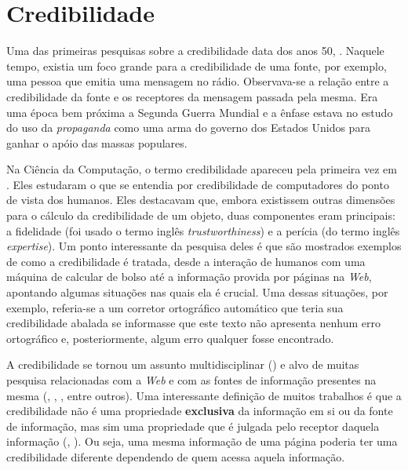 \section{Credibilidade}
\label{sec::credibilidade}

Uma das primeiras pesquisas sobre a credibilidade data dos anos 50, \cite{Hovland51}. Naquele tempo, existia um foco grande para a credibilidade de uma fonte, por exemplo, uma pessoa que emitia uma mensagem no rádio. Observava-se a relação entre a credibilidade da fonte e os receptores da mensagem passada pela mesma. Era uma época bem próxima a Segunda Guerra Mundial e a ênfase estava no estudo do uso da \textit{propaganda} como uma arma do governo dos Estados Unidos para ganhar o apóio das massas populares.

Na Ciência da Computação, o termo credibilidade apareceu pela primeira vez em \cite{Tseng99}. 
Eles estudaram o que se entendia por credibilidade de computadores do ponto de vista dos humanos.
Eles destacavam que, embora existissem outras dimensões para o cálculo da credibilidade de um objeto, duas componentes eram principais: a fidelidade (foi usado o termo inglês \textit{trustworthiness}) e a perícia (do termo inglês \textit{expertise}).
Um ponto interessante da pesquisa deles é que são mostrados exemplos de como a credibilidade é tratada, desde a interação de humanos com uma máquina de calcular de bolso até a informação provida por páginas na \textit{Web}, apontando algumas situações nas quais ela é crucial.
Uma dessas situações, por exemplo, referia-se a um corretor ortográfico automático que teria sua credibilidade abalada se informasse que este texto não apresenta nenhum erro ortográfico e, posteriormente, algum erro qualquer fosse encontrado.

A credibilidade se tornou um assunto multidisciplinar (\cite{Rieh07}) e alvo de muitas pesquisa relacionadas com a \textit{Web} e com as fontes de informação presentes na mesma (\cite{Sundar99}, \cite{Freeman04}, \cite{Flanagin07}, entre outros).
Uma interessante definição de muitos trabalhos é que a credibilidade não é uma propriedade \textbf{exclusiva} da informação em si ou da fonte de informação, mas sim uma propriedade que é julgada pelo receptor daquela informação (\cite{Sundar99}, \cite{Freeman04}). Ou seja, uma mesma informação de uma página poderia ter uma credibilidade diferente dependendo de quem acessa aquela informação.

